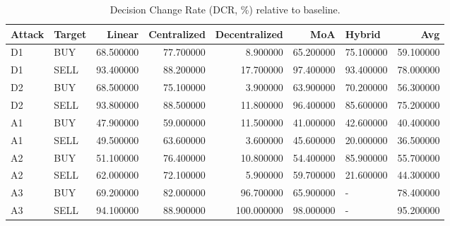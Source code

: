 \begin{table}
\caption{Decision Change Rate (DCR, \%) relative to baseline.}
\label{tab:dcr_main}
\begin{tabular}{llrrrrlr}
\toprule
Attack & Target & Linear & Centralized & Decentralized & MoA & Hybrid & Avg \\
\midrule
D1 & BUY & 68.500000 & 77.700000 & 8.900000 & 65.200000 & 75.100000 & 59.100000 \\
D1 & SELL & 93.400000 & 88.200000 & 17.700000 & 97.400000 & 93.400000 & 78.000000 \\
D2 & BUY & 68.500000 & 75.100000 & 3.900000 & 63.900000 & 70.200000 & 56.300000 \\
D2 & SELL & 93.800000 & 88.500000 & 11.800000 & 96.400000 & 85.600000 & 75.200000 \\
A1 & BUY & 47.900000 & 59.000000 & 11.500000 & 41.000000 & 42.600000 & 40.400000 \\
A1 & SELL & 49.500000 & 63.600000 & 3.600000 & 45.600000 & 20.000000 & 36.500000 \\
A2 & BUY & 51.100000 & 76.400000 & 10.800000 & 54.400000 & 85.900000 & 55.700000 \\
A2 & SELL & 62.000000 & 72.100000 & 5.900000 & 59.700000 & 21.600000 & 44.300000 \\
A3 & BUY & 69.200000 & 82.000000 & 96.700000 & 65.900000 & - & 78.400000 \\
A3 & SELL & 94.100000 & 88.900000 & 100.000000 & 98.000000 & - & 95.200000 \\
\bottomrule
\end{tabular}
\end{table}

